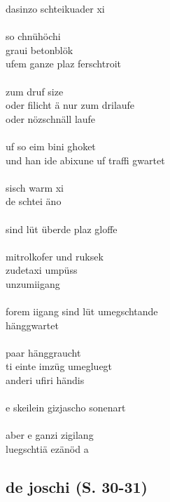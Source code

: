 \documentclass[a4paper,11pt]{scrartcl}
\begin{document}
\begin{multicols}{2}
\noindent
dasinzo schteikuader xi\\
\\
so chnühöchi\\
graui betonblök\\
ufem ganze plaz ferschtroit\\
\\
zum druf size\\
oder filicht ä nur zum drilaufe\\
oder nözschnäll laufe\\
\\
uf so eim bini ghoket\\
und han ide abixune uf traffi gwartet\\
\\
sisch warm xi\\
de schtei äno\\
\\
sind lüt überde plaz gloffe\\
\\
mitrolkofer und ruksek\\
zudetaxi umpüss\\
unzumiigang\\
\\
forem iigang sind lüt umegschtande\\
hänggwartet\\
\\
paar hänggraucht\\
ti einte imzüg umegluegt\\
anderi ufiri händis\\
\\
e skeilein gizjascho sonenart\\
\\
aber e ganzi zigilang\\
luegschtiä ezänöd a
\end{multicols}

\subsection*{de joschi (S. 30-31)}
\end{document}
